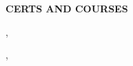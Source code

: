 


\vspace{\spaceBeforeSection}
\textbf{CERTS AND COURSES} \hrulefill
\vspace{\spaceAfterSection}


    \href{\certScrumMasterUrl}{\certScrumMasterBreak} 

    \begin{small}
        \certScrumMasterWho, \ \certScrumMasterWhen
    \end{small}


    \medskip

    \href{\certCookiesUrl}{\certCookiesBreak}

    \begin{small}
        \certCookiesWho, \ \certCookiesWhen
    \end{small}

    
